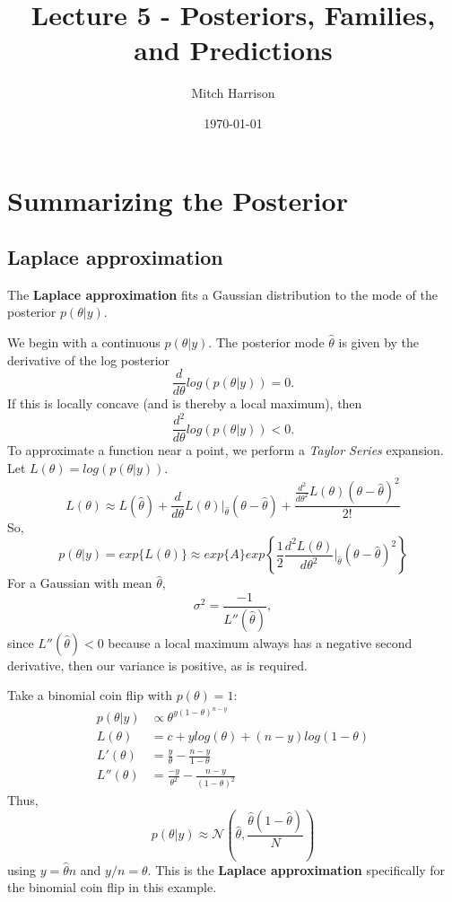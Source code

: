 \documentclass[titlepage, 12pt, leqno]{article}
\title{\Huge{Lecture 5 - Posteriors, Families, and Predictions}}
\author{\large{Mitch Harrison}}
\date{\today}
\begin{document}
\setlength{\parskip}{1\baselineskip}
\setlength{\parindent}{15pt}
\maketitle
\tableofcontents
\newpage


\section{Summarizing the Posterior}

\subsection{Laplace approximation}
\begin{definition}
    The \textbf{Laplace approximation} fits a Gaussian distribution to the mode of
    the posterior $p(\theta|y)$.
\end{definition}

We begin with a continuous $p(\theta|y)$. The posterior mode $\hat \theta$ is 
given by the derivative of the log posterior
\[
    \frac{d}{d\theta} log\left(p(\theta|y)\right) = 0.
\]
If this is locally concave (and is thereby a local maximum), then
\[
    \frac{d^{2}}{d \theta} log\left(p(\theta|y)\right) < 0.
\]
To approximate a function near a point, we perform a \textit{Taylor Series}
expansion. Let $L(\theta) = log\left(p(\theta|y)\right)$.
\[
    L(\theta) \approx L(\hat \theta) + \frac{d}{d \theta}L(\theta) |_{\hat
    \theta}(\theta - \hat \theta) +\frac{\frac{d^{2}}{d \theta^{2}}
    L(\theta) (\theta - \hat \theta)^{2}}{2!} 
\]
So,
\[
    p(\theta|y) = exp\{L(\theta)\} \approx exp\{A\}exp\left\{\frac{1}{2}
    \frac{d^{2}L(\theta)}{d \theta^{2}}|_{\hat \theta}(\theta - \hat
    \theta)^{2}\right\}
\]
For a Gaussian with mean $\hat \theta$, 
\[
\sigma^{2} = \frac{-1}{L''(\hat \theta)},
\]
since $L''(\hat \theta) < 0$ because a local maximum always has a negative
second derivative, then our variance is positive, as is required.

\begin{ex}
    Take a binomial coin flip with $p(\theta) = 1$:
    \begin{align*}
        p(\theta|y) &\propto \theta^{y(1-\theta)^{n-y}}\\
        L(\theta) &= c + ylog(\theta) + (n-y)log(1-\theta)\\
        L'(\theta) &= \frac{y}{\theta} - \frac{n-y}{1- \theta}\\
        L''(\theta) &= \frac{-y}{\theta^{2}} - \frac{n-y}{(1-\theta)^{2}}
    \end{align*}
    Thus,
    \[
    \boxed{p(\theta|y) \approx \mathcal{N}\left(\hat\theta, 
        \frac{\hat \theta(1-\hat\theta)}{N}\right)} 
    \]
    using $y = \hat \theta n$ and $y/n = \theta$. This is the \textbf{Laplace
    approximation} specifically for the binomial coin flip in this example.
\end{ex}
\end{document}
